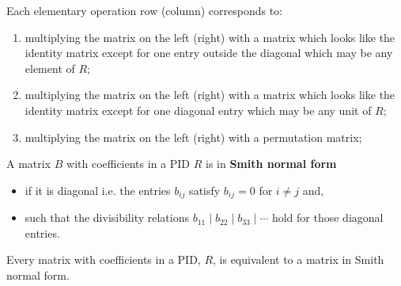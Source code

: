 \documentclass[12pt, a4paper]{article}
\begin{document}
\begin{mdremark}
    Each elementary operation row (column) corresponds to: 
    \begin{enumerate}
        \item multiplying the matrix on the left (right) with a matrix which looks like the identity matrix except for one entry outside the diagonal which may be any element of \(R\);
        \item multiplying the matrix on the left (right) with a matrix which looks like the identity matrix except for one diagonal entry which may be any unit of \(R\);
        \item multiplying the matrix on the left (right) with a permutation matrix;
    \end{enumerate}
\end{mdremark}

\begin{definition}
    A matrix \(B\) with coefficients in a PID \(R\) is in \textbf{Smith normal form} 
    \begin{itemize}
        \item if it is diagonal i.e. the entries \(b_{ij}\) satisfy \(b_{ij}=0\) for \(i\neq j\) and,
        \item such that the divisibility relations \(b_{11}\mid b_{22}\mid b_{33} \mid\cdots\) hold for those diagonal entries.
    \end{itemize}
\end{definition}

\begin{mdthm} 
    Every matrix with coefficients in a PID, \(R\), is equivalent to a matrix in Smith normal form.
\end{mdthm}
\end{document}
